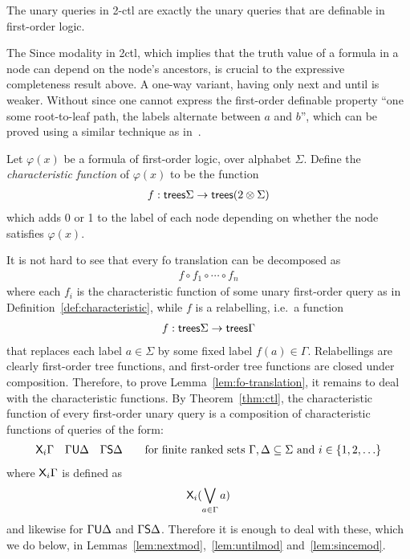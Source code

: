\begin{theorem} \label{thm:ctl} The unary queries in 2-ctl are exactly the unary queries that are definable in first-order logic.
\end{theorem}

The Since modality in 2ctl, which implies that the truth value of a formula in a node can depend on the node's ancestors, is crucial to the  expressive completeness result above. A one-way variant, having only next and until is weaker. Without since one cannot express the first-order definable property ``one some root-to-leaf path, the labels alternate between $a$ and $b$'', which can be proved using a similar technique as in~\cite[Theorem 1]{bojanczyk2008common}. 
\begin{definition}\label{def:characteristic}
    Let $\varphi(x)$ be a formula of first-order logic, over alphabet $\Sigma$. Define the \emph{characteristic function} of $\varphi(x)$ to be the function
            \begin{align*}
                f : \mathsf {trees} \Sigma \to \mathsf {trees} (2 \otimes \Sigma)
            \end{align*}
            which adds 0 or 1 to  the label of each node depending on whether the node satisfies $\varphi(x)$.
\end{definition}


It is not hard to see that every fo translation can be decomposed as 
    \begin{align*}
        f \circ f_1 \circ \cdots \circ f_n
    \end{align*}
    where each $f_i$ is the characteristic function of some unary first-order query as in Definition~\ref{def:characteristic}, while $f$ is a relabelling, i.e.~a function
    \begin{align*}
        f : \mathsf {trees} \Sigma \to \mathsf {trees} \Gamma
    \end{align*}
    that replaces each label $a \in \Sigma$ by some fixed label  $f(a) \in \Gamma$. Relabellings are clearly first-order tree functions, and first-order tree functions are closed under composition. Therefore, to prove Lemma~\ref{lem:fo-translation}, it remains to deal with the characteristic functions. By Theorem~\ref{thm:ctl}, the characteristic function of every first-order unary query is a composition of characteristic functions of queries of the form:
    \begin{align*}
        \mathsf X_i \Gamma \quad \Gamma \mathsf U \Delta \quad \Gamma \mathsf S \Delta \qquad \text{for finite ranked sets $\Gamma,\Delta \subseteq \Sigma$ and $i \in \{1,2,\ldots\}$} 
    \end{align*}
    where $\mathsf X_i \Gamma$ is defined as 
    \begin{align*}
        \mathsf X_i (\bigvee_{a \in \Gamma} a) 
    \end{align*}
    and likewise for $\Gamma \mathsf U \Delta $ and $ \Gamma \mathsf S \Delta$. Therefore it is enough to  deal with these, which we do below, in Lemmas~\ref{lem:nextmod},~\ref{lem:untilmod} and~\ref{lem:sincemod}.



